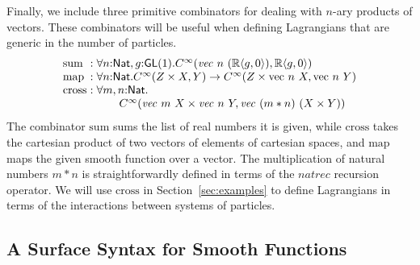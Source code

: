 \documentclass{sigplanconf}
\theoremstyle{examplestyle}
\begin{document}
Finally, we include three primitive combinators for dealing with
$n$-ary products of vectors. These combinators will be useful when
defining Lagrangians that are generic in the number of particles.
\begin{displaymath}
  \begin{array}{l@{\hspace{0.3em}}c@{\hspace{0.3em}}l}
    \mathrm{sum} &:& \forall n \mathord: \mathsf{Nat}, g \mathord: \mathsf{GL}(1). C^\infty(\mathit{vec}~n~(\mathbb{R}\langle g, 0 \rangle), \mathbb{R}\langle g, 0\rangle) \\
    \mathrm{map} &:& \forall n \mathord: \mathsf{Nat}. C^\infty(Z \times X,Y) \to C^\infty(Z \times \mathrm{vec}~n~X, \mathrm{vec}~n~Y) \\
    \mathrm{cross} &:& 
    \begin{array}[t]{@{}l}
      \forall m,n \mathord: \mathsf{Nat}.\\
      \quad\quad C^\infty(\mathit{vec}~m~X \times \mathit{vec}~n~Y, \mathit{vec}~(m*n)~(X \times Y))
    \end{array}
  \end{array}
\end{displaymath}
The combinator $\mathrm{sum}$ sums the list of real numbers it is
given, while $\mathrm{cross}$ takes the cartesian product of two
vectors of elements of cartesian spaces, and $\mathrm{map}$ maps the
given smooth function over a vector. The multiplication of natural
numbers $m*n$ is straightforwardly defined in terms of the
$\mathit{natrec}$ recursion operator. We will use $\mathrm{cross}$ in
Section~\ref{sec:examples} to define Lagrangians in terms of the
interactions between systems of particles.

\subsection{A Surface Syntax for Smooth Functions}
\label{sec:surface-syntax}
\end{document}
